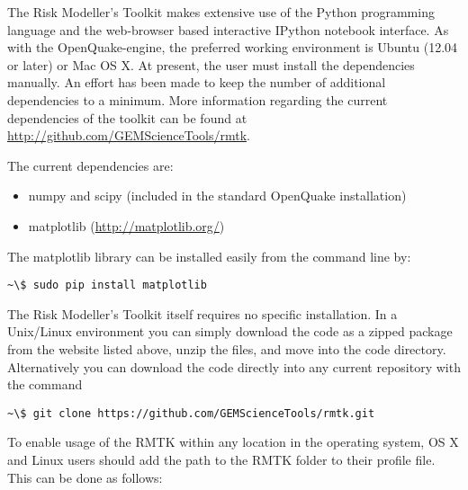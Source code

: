 The Risk Modeller's Toolkit makes extensive use of the Python programming language and the web-browser based interactive IPython notebook interface. As with the OpenQuake-engine, the preferred working environment is Ubuntu (12.04 or later) or Mac OS X. At present, the user  must install the dependencies manually. An effort has been made to keep the number of additional dependencies to a minimum. More information regarding the current dependencies of the toolkit can be found at \href{http://github.com/GEMScienceTools/rmtk}{http://github.com/GEMScienceTools/rmtk}.

The current dependencies are:
\begin{itemize}
\item numpy and scipy (included in the standard OpenQuake installation)
\item matplotlib (\href{http://matplotlib.org/}{http://matplotlib.org/})
\end{itemize}

The matplotlib library can be installed easily from the command line by:

\begin{Verbatim}[frame=single, commandchars=\\\{\}, fontsize=\scriptsize]
~\$ sudo pip install matplotlib
\end{Verbatim}

The Risk Modeller's Toolkit itself requires no specific installation. In a Unix/Linux environment you can simply download the code as a zipped package from the website listed above, unzip the files, and move into the code directory. Alternatively you can download the code directly into any current repository with the command

\begin{Verbatim}[frame=single, commandchars=\\\{\}, fontsize=\scriptsize]
~\$ git clone https://github.com/GEMScienceTools/rmtk.git
\end{Verbatim}

To enable usage of the RMTK within any location in the operating system, OS X and Linux users should add the path to the RMTK folder to their profile file. This can be done as follows:

